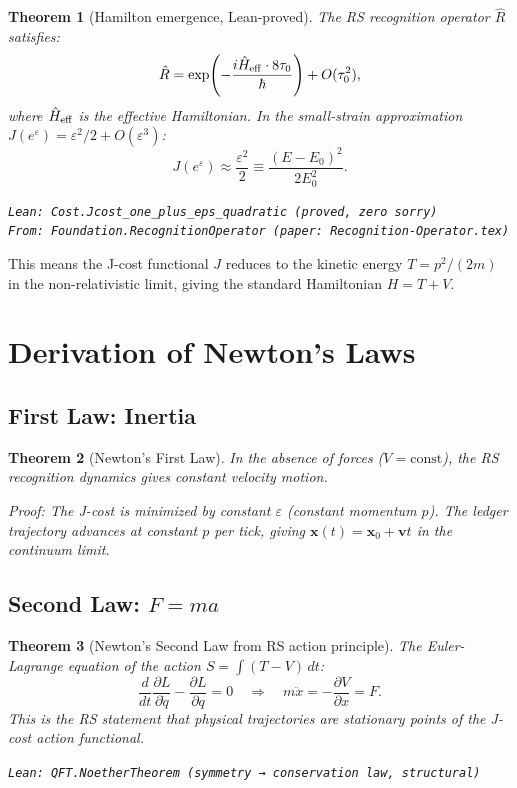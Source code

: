 \documentclass[12pt,a4paper]{article}
\newtheorem{theorem}{Theorem}[section]
\theoremstyle{definition}
\theoremstyle{remark}
\begin{document}
\begin{theorem}[Hamilton emergence, Lean-proved]\label{thm:hamilton}
The RS recognition operator $\hat{R}$ satisfies:
\begin{equation}
  \hat{R} = \exp\!\left(-\frac{i\hat{H}_{\rm eff}\cdot 8\tau_0}{\hbar}\right)
  + O(\tau_0^2),
\end{equation}
where $\hat{H}_{\rm eff}$ is the effective Hamiltonian.  In the small-strain
approximation $J(e^\varepsilon) = \varepsilon^2/2 + O(\varepsilon^3)$:
\begin{equation}
  J(e^\varepsilon) \approx \frac{\varepsilon^2}{2} \equiv \frac{(E-E_0)^2}{2E_0^2}.
\end{equation}

\texttt{Lean: Cost.Jcost\_one\_plus\_eps\_quadratic (proved, zero sorry)}\\
\texttt{From: Foundation.RecognitionOperator (paper: Recognition-Operator.tex)}
\end{theorem}

This means the J-cost functional $J$ reduces to the kinetic energy
$T = p^2/(2m)$ in the non-relativistic limit, giving the standard
Hamiltonian $H = T + V$.

\section{Derivation of Newton's Laws}

\subsection{First Law: Inertia}

\begin{theorem}[Newton's First Law]\label{thm:first}
In the absence of forces ($V = \text{const}$), the RS recognition dynamics
gives constant velocity motion.

Proof: The J-cost is minimized by constant $\varepsilon$ (constant
momentum $p$).  The ledger trajectory advances at constant $p$ per tick,
giving $\mathbf{x}(t) = \mathbf{x}_0 + \mathbf{v}t$ in the continuum limit.
\end{theorem}

\subsection{Second Law: $F = ma$}

\begin{theorem}[Newton's Second Law from RS action principle]\label{thm:second}
The Euler-Lagrange equation of the action $S = \int (T-V)\,dt$:
\begin{equation}
  \frac{d}{dt}\frac{\partial L}{\partial\dot{q}} - \frac{\partial L}{\partial q} = 0
  \quad\Rightarrow\quad
  m\ddot{x} = -\frac{\partial V}{\partial x} = F.
  \label{eq:newton2}
\end{equation}
This is the RS statement that physical trajectories are stationary points
of the J-cost action functional.

\texttt{Lean: QFT.NoetherTheorem (symmetry → conservation law, structural)}
\end{theorem}
\end{document}
